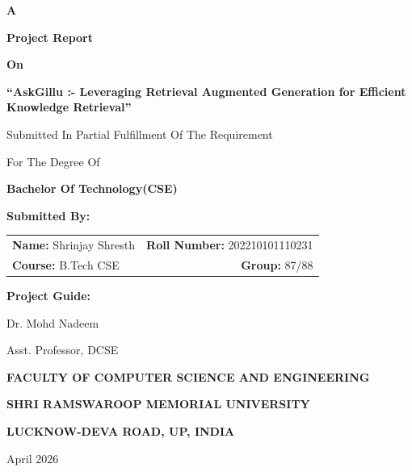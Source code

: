 \documentclass[12pt,a4paper]{report}
\begin{document}
\begin{titlepage}
    \begin{center}
        {\Large \textbf{A}\par}
        {\Large \textbf{Project Report}\par}
        {\Large \textbf{On}\par}
        \vspace{0.5cm}
        {\fontsize{20}{24}\bfseries ``AskGillu :- Leveraging Retrieval Augmented Generation for Efficient Knowledge Retrieval''\par}
        \vspace{1.5cm}
        {\Large Submitted In Partial Fulfillment Of The Requirement\par}
        {\Large For The Degree Of\par}
        \vspace{0.5cm}
        {\Large \textbf{Bachelor Of Technology(CSE)}\par}
        
        \vfill
        
        \begin{flushleft}
        {\large \textbf{Submitted By:}}\par
        \vspace{0.2cm}
        \begin{tabularx}{\textwidth}{@{}X r@{}}
        \textbf{Name:} Shrinjay Shresth & \textbf{Roll Number:} 202210101110231 \\
        \textbf{Course:} B.Tech CSE & \textbf{Group:} 87/88 \\
        \end{tabularx}
        \end{flushleft}
        
        \vspace{1.5cm}
        
        \begin{flushleft}
        {\large \textbf{Project Guide:}}\par
        {\large Dr. Mohd Nadeem}\par
        {\large Asst. Professor, DCSE}\par
        \end{flushleft}
        
        \vspace{2cm}
        
        {\large \textbf{FACULTY OF COMPUTER SCIENCE AND ENGINEERING}\par}
        {\large \textbf{SHRI RAMSWAROOP MEMORIAL UNIVERSITY}\par}
        {\large \textbf{LUCKNOW-DEVA ROAD, UP, INDIA}\par}
        {\large April 2026\par}
    \end{center}
\end{titlepage}
\end{document}
